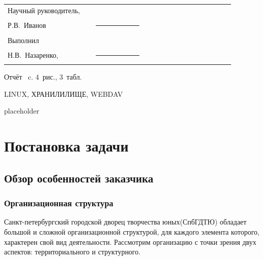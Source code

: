 \documentclass[utf8,usehyperref,12pt]{G7-32}
\begin{document}

\frontmatter %



\Executors %
\begin{longtable}{p{0.35\linewidth}p{0.2\linewidth}p{0.35\linewidth}}
Научный руководитель, 	&		&	\\
Р.В.~Иванов	&\rule{1\linewidth}{0.1pt}	&  \\ \vspace{1cm}

Выполнил  &		&	\\
Н.В.~Назаренко, & \rule{1\linewidth}{0.1pt}& \\
\end{longtable}

\Referat %
Отчёт \pageref{LastPage}~c. 4~рис., 3~табл.

\MakeUppercase{Linux, хранилилище, webdav}






\Introduction

placeholder

\mainmatter %

\chapter{Постановка задачи}
\section{Обзор особенностей заказчика}
\subsection{Организационная структура}
Санкт-петербургский городской дворец творчества юных(СпбГДТЮ) обладает большой и сложной организационной структурой, для каждого элемента которого, характерен свой вид деятельности. Рассмотрим организацию с точки зрения двух аспектов: территориального и структурного.
\end{document}
